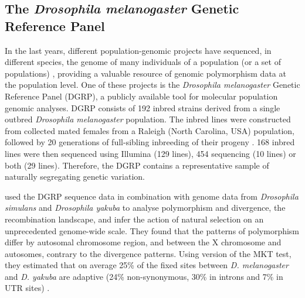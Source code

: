 \subsection{The \textit{Drosophila melanogaster} Genetic Reference Panel} 
\label{DGRP}
In the last years, different population-genomic projects have sequenced, in different species, the genome of many individuals of a population (or a set of populations) \citep{The1000GenomesProjectConsortium2010,Mackay2012,Pool2012,Wallberg2014}, providing a valuable resource of genomic polymorphism data at the population level.
One of these projects is the \textit{Drosophila melanogaster} Genetic Reference Panel (DGRP), a publicly available tool for molecular population genomic analyses.
%
DGRP consists of 192 inbred strains derived from a single outbred \textit{Drosophila melanogaster} population.
The inbred lines were constructed from collected mated females from a Raleigh (North Carolina, USA) population, followed by 20 generations of full-sibling inbreeding of their progeny \citep{Mackay2012}.
168 inbred lines were then sequenced using Illumina (129 lines), 454 sequencing (10 lines) or both (29 lines). Therefore, the DGRP contains a representative sample of naturally segregating genetic variation.

\citealp{Mackay2012} used the DGRP sequence data in combination with genome data from \textit{Drosophila simulans} and \textit{Drosophila yakuba} to analyse polymorphism and divergence, the recombination landscape, and infer the action of natural selection on an unprecedented genome-wide scale.
They found that the patterns of polymorphism differ by autosomal chromosome region, and between the X chromosome and autosomes, contrary to the divergence patterns.
Using version of the MKT test, they estimated that on average 25\% of the fixed sites between \textit{D. melanogaster} and \textit{D. yakuba} are adaptive (24\% non-synonymous, 30\% in introns and 7\% in UTR sites) \citep{Mackay2012}.
